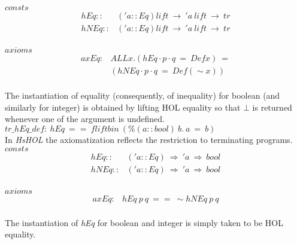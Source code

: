 \documentclass[a4paper,12pt]{article}
\begin{document}
\noindent $consts$ 
$$ \begin{array}{ll}
hEq :: & ('a::Eq) lift \ \to \ 'a \ lift \ \to \ tr \\
hNEq :: & ('a::Eq) lift \ \to \ 'a \ lift \ \to \ tr\\
\end{array}$$

\noindent $axioms$ 
$$\begin{array}{ll}
axEq: & ALL x. (hEq \cdot p \cdot q \ = \ Def x) \ = \\
 & (hNEq \cdot p \cdot q \ = \ Def (\sim x)) \\
\end{array}$$

\noindent The instantiation of equality (consequently, of inequality) for
boolean (and similarly for integer) is obtained by lifting HOL
equality so that $\bot$ is returned whenever one of the argument is
undefined.\\

\noindent $tr\_hEq\_def: \ hEq \ == \ fliftbin \ (\% (a::bool) \ b. \ a \ = \ b)$\\



\noindent In \emph{HsHOL} the axiomatization reflects the
restriction to terminating programs.\\

\noindent $consts$ 
$$\begin{array}{ll}
hEq :: & ('a::Eq) \ \Rightarrow \ 'a \ \Rightarrow \ bool \\
hNEq :: & ('a::Eq) \ \Rightarrow \ 'a \ \Rightarrow \ bool \\
\end{array}$$

\noindent $axioms$ 
$$\begin{array}{ll}
 axEq: & hEq \ p \ q \ == \ \sim hNEq \ p \ q \\
\end{array}$$

\noindent The instantiation of \emph{hEq} for boolean and integer is
simply taken to be HOL equality.

\end{document}
